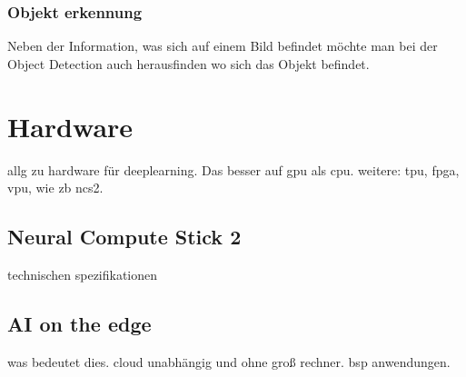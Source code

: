 \subsubsection{Objekt erkennung}\label{sec:objdet}

Neben der Information, was sich auf einem Bild befindet möchte
man bei der Object Detection auch herausfinden wo sich das 
Objekt befindet.





\section{Hardware}\label{sec:hardware}


allg zu hardware für deeplearning. Das besser auf gpu als cpu. weitere: tpu, fpga, vpu, wie zb ncs2.

\subsection{Neural Compute Stick 2}

technischen spezifikationen





\subsection{AI on the edge}

was bedeutet dies. cloud unabhängig und ohne groß rechner. bsp anwendungen.

